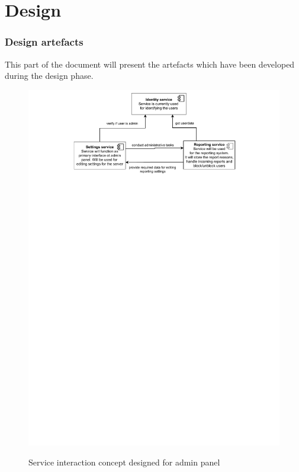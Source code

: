 

\chapter{Design}\label{ch:design}
\subsection{Design artefacts}
This part of the document will present the artefacts which have been developed during the design phase.

\begin{figure}[h]
	\centering
	\caption{Service interaction concept designed for admin panel}
	\includegraphics[width=1.0\textwidth]{./images/component_interaction.pdf}
	\label{fig:componentInteraction}
\end{figure}

